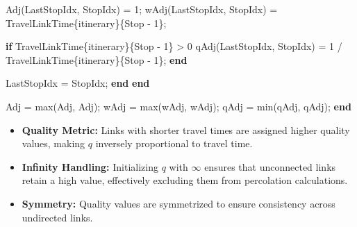\documentclass[
  letterpaper,
  DIV=11,
  numbers=noendperiod]{scrartcl}
\newenvironment{Shaded}{\begin{snugshade}}{\end{snugshade}}
\newcommand{\FloatTok}[1]{\textcolor[rgb]{0.68,0.00,0.00}{#1}}
\newcommand{\KeywordTok}[1]{\textcolor[rgb]{0.00,0.23,0.31}{\textbf{#1}}}
\newcommand{\NormalTok}[1]{\textcolor[rgb]{0.00,0.23,0.31}{#1}}
\newcommand{\OperatorTok}[1]{\textcolor[rgb]{0.37,0.37,0.37}{#1}}
\newcommand{\VariableTok}[1]{\textcolor[rgb]{0.07,0.07,0.07}{#1}}
\providecommand{\tightlist}{%
  \setlength{\itemsep}{0pt}\setlength{\parskip}{0pt}}\usepackage{longtable,booktabs,array}
\begin{document}
\begin{Shaded}
\begin{Highlighting}[]
            \VariableTok{Adj}\NormalTok{(}\VariableTok{LastStopIdx}\OperatorTok{,} \VariableTok{StopIdx}\NormalTok{) }\OperatorTok{=} \FloatTok{1}\OperatorTok{;}
            \VariableTok{wAdj}\NormalTok{(}\VariableTok{LastStopIdx}\OperatorTok{,} \VariableTok{StopIdx}\NormalTok{) }\OperatorTok{=} \VariableTok{TravelLinkTime}\NormalTok{\{}\VariableTok{itinerary}\NormalTok{\}\{}\VariableTok{Stop} \OperatorTok{{-}} \FloatTok{1}\NormalTok{\}}\OperatorTok{;}

            \KeywordTok{if} \VariableTok{TravelLinkTime}\NormalTok{\{}\VariableTok{itinerary}\NormalTok{\}\{}\VariableTok{Stop} \OperatorTok{{-}} \FloatTok{1}\NormalTok{\} }\OperatorTok{\textgreater{}} \FloatTok{0}
                \VariableTok{qAdj}\NormalTok{(}\VariableTok{LastStopIdx}\OperatorTok{,} \VariableTok{StopIdx}\NormalTok{) }\OperatorTok{=} \FloatTok{1} \OperatorTok{/} \VariableTok{TravelLinkTime}\NormalTok{\{}\VariableTok{itinerary}\NormalTok{\}\{}\VariableTok{Stop} \OperatorTok{{-}} \FloatTok{1}\NormalTok{\}}\OperatorTok{;}
            \KeywordTok{end}

            \VariableTok{LastStopIdx} \OperatorTok{=} \VariableTok{StopIdx}\OperatorTok{;}
        \KeywordTok{end}
    \KeywordTok{end}

    \VariableTok{Adj} \OperatorTok{=} \VariableTok{max}\NormalTok{(}\VariableTok{Adj}\OperatorTok{,} \VariableTok{Adj}\OperatorTok{\textquotesingle{}}\NormalTok{)}\OperatorTok{;}
    \VariableTok{wAdj} \OperatorTok{=} \VariableTok{max}\NormalTok{(}\VariableTok{wAdj}\OperatorTok{,} \VariableTok{wAdj}\OperatorTok{\textquotesingle{}}\NormalTok{)}\OperatorTok{;}
    \VariableTok{qAdj} \OperatorTok{=} \VariableTok{min}\NormalTok{(}\VariableTok{qAdj}\OperatorTok{,} \VariableTok{qAdj}\OperatorTok{\textquotesingle{}}\NormalTok{)}\OperatorTok{;}
\KeywordTok{end}
\end{Highlighting}
\end{Shaded}

\begin{itemize}
\tightlist
\item
  \textbf{Quality Metric:} Links with shorter travel times are assigned
  higher quality values, making \(q\) inversely proportional to travel
  time.
\item
  \textbf{Infinity Handling:} Initializing \(q\) with \(\infty\) ensures
  that unconnected links retain a high value, effectively excluding them
  from percolation calculations.
\item
  \textbf{Symmetry:} Quality values are symmetrized to ensure
  consistency across undirected links.
\end{itemize}
\end{document}

